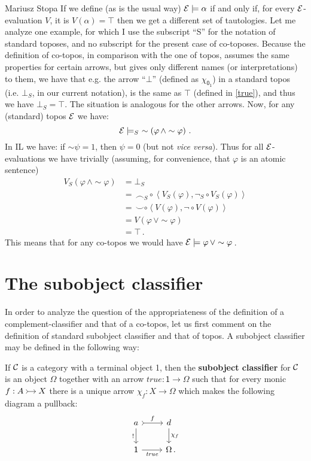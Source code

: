 \begin{artengenv}{Mariusz Stopa}
If we define (as is the usual way) $\mathcal{E} \models \alpha$ if and only if, for every $ \mathcal{E}$-evaluation $ V $, it is $ V(\alpha)=\top $ then we get a different set of tautologies. Let me analyze one example, for which I use the subscript ``S'' for the notation of standard toposes, and no subscript for the present case of co-toposes. Because the definition of co-topos, in comparison with the one of topos, assumes the same properties for certain arrows, but gives only different names (or interpretations) to them, we have that e.g. the arrow ``$ \bot $'' (defined as $ \chi_{\textsf{0}_{\textsf{1}}} $) in a standard topos (i.e. $ \bot_S $, in our current notation), is the same as $ \top $ (defined in \eqref{true}), and thus we have $ \bot_S=\top $. The situation is analogous for the other arrows. Now, for any (standard) topos $ \mathcal{E} $ we have:
\[\mathcal{E}\models_S \ \sim \left(\varphi\, \land \sim\varphi\right)\,.
\]
In IL we have: if $\sim\! \psi = 1$, then $\psi=0$ (but not \textit{vice versa}). Thus for all $\mathcal{E}$-evaluations we have trivially (assuming, for convenience, that $ \varphi $ is an atomic sentence)
\begin{align*}
V_S(\varphi\, \land \sim\varphi) &= \bot_S \\
&= \, \smallfrown_S \circ \left< V_S(\varphi), \lnot_S \circ V_S(\varphi)\right>\\
&=\,\smallsmile \circ \left< V(\varphi), \lnot \circ V(\varphi)\right>\\
&=V( \varphi\, \lor \sim\varphi)\\
&=\top \,. 
\end{align*}
This means that for any co-topos we would have $\mathcal{E} \models \varphi\, \lor \sim\varphi\,$.

\section{The subobject classifier}

In order to analyze the question of the appropriateness of the definition of a comple\-ment-classifier and that of a co-topos, let us first comment on the definition of standard subobject classifier and that of topos. A subobject classifier may be defined in the following way:

\begin{definition}
	If $ \mathcal{C} $ is a category with a terminal object \textsf{1}, then the \textbf{subobject classifier} for $ \mathcal{C} $ is an object $\Omega$ together with an arrow $ \textit{true}: \textsf{1} \to \Omega $ such that for every monic $\begin{tikzcd}[cramped, sep=small] f: A \ar[r, tail]  & X \end{tikzcd}$ there is a unique arrow $ \chi_f :X \to \Omega$  which makes the following diagram a pullback:
	\[\begin{tikzcd} 
	a \arrow[r, "f", tail] \arrow[d,"!"']    & d \arrow[d, "\chi_f"] \\
	\textsf{1} \arrow[r, "\textit{true}"'] & \Omega \nospacepunct{.}
 	\end{tikzcd}
	\]
\end{definition}


\end{artengenv}
